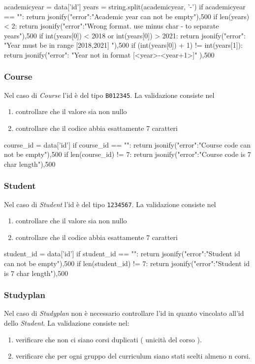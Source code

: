 \documentclass{article}
\begin{document}
\begin{python}
academicyear = data['id']
years = string.split(academicyear, '-')
if academicyear == "":
	return jsonify({"error":"Academic year can not be empty"}),500
if len(years) < 2:
	return jsonify({"error":"Wrong format. use minus char - to separate years"}),500
if int(years[0]) < 2018 or int(years[0]) > 2021:
	return jsonify({"error": "Year must be in range [2018,2021] "}),500
if (int(years[0]) + 1) != int(years[1]):
	return jsonify({"error": "Year not in format [<year>-<year+1>]" }),500
\end{python}

\subsubsection{Course}
Nel caso di \emph{Course} l'id è del tipo \texttt{B012345}. La validazione consiste nel
\begin{enumerate}
\item controllare che il valore sia non nullo
\item controllare che il codice abbia esattamente 7 caratteri
\end{enumerate}

\begin{python}
course_id = data['id']
if course_id == "":
	return jsonify({"error":"Course code can not be empty"}),500
if len(course_id) != 7:
	return jsonify({"error":"Course code is 7 char length"}),500
\end{python}


\subsubsection{Student}
Nel caso di \emph{Student} l'id è del tipo \texttt{1234567}. La validazione consiste nel
\begin{enumerate}
\item controllare che il valore sia non nullo
\item controllare che il codice abbia esattamente 7 caratteri
\end{enumerate}

\begin{python}
student_id = data['id']
if student_id == "":
	return jsonify({"error":"Student id can not be empty"}),500
if len(student_id) != 7:
	return jsonify({"error":"Student id is 7 char length"}),500
\end{python}

\subsubsection{Studyplan}
Nel caso di \emph{Studyplan} non è necessario controllare l'id in quanto vincolato all'id dello \emph{Student}.
La validazione consiste nel:
\begin{enumerate}
\item verificare che non ci siano corsi duplicati ( unicità del corso ).
\item verificare che per ogni gruppo del curriculum siano stati scelti almeno n corsi.
\end{enumerate}
\end{document}
